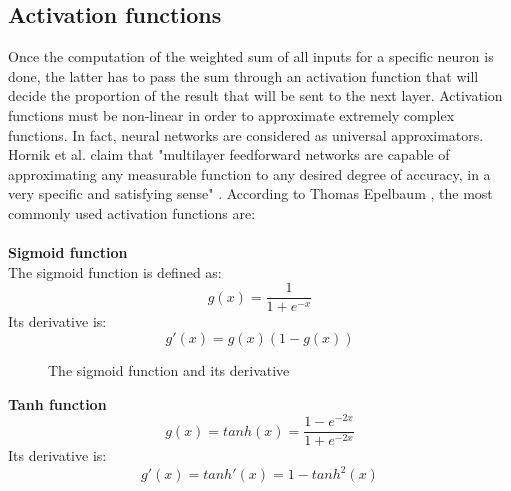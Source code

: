 \subsection{Activation functions}
\label{activation_functions}
Once the computation of the weighted sum of all inputs for a specific neuron is done, the latter has to pass the sum through an activation function that will decide the proportion of the result that will be sent to the next layer. Activation functions must be non-linear in order to approximate extremely complex functions. In fact, neural networks are considered as universal approximators. Hornik et al. claim that "multilayer feedforward networks are capable of approximating any measurable function to any desired degree of accuracy, in a very specific and satisfying sense" \cite{17}. According to Thomas Epelbaum \cite{18}, the most commonly used activation functions are:\\\\
 \noindent \textbf{Sigmoid function}\\
 The sigmoid function is defined as:
 \begin{equation}
  g(x) = \frac{1}{1+e^{-x}}
 \end{equation}
 Its derivative is:
 \begin{equation}
 g'(x) = g(x)(1-g(x))
 \end{equation}
 


\begin{figure}[h!]
  \begin{center}
    \caption{The sigmoid function and its derivative}
  \end{center}
\end{figure} 
 
 
 \noindent \textbf{Tanh function}\\
 \begin{equation}
 g(x) = tanh(x) = \frac{1-e^{-2x}}{1+e^{-2x}}
 \end{equation}
 Its derivative is:
 \begin{equation}
 g'(x) = tanh'(x) = 1-tanh^{2}(x)
 \end{equation}
 
